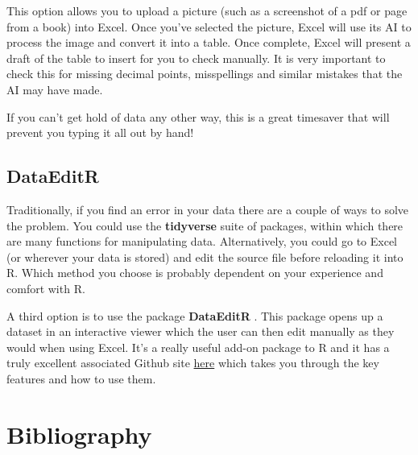 \documentclass[
]{book}
\begin{document}
This option allows you to upload a picture (such as a screenshot of a pdf or page from a book) into Excel. Once you've selected the picture, Excel will use its AI to process the image and convert it into a table. Once complete, Excel will present a draft of the table to insert for you to check manually. It is very important to check this for missing decimal points, misspellings and similar mistakes that the AI may have made.

If you can't get hold of data any other way, this is a great timesaver that will prevent you typing it all out by hand!

\hypertarget{dataeditr}{%
\section{DataEditR}\label{dataeditr}}

Traditionally, if you find an error in your data there are a couple of ways to solve the problem. You could use the \textbf{tidyverse} suite of packages, within which there are many functions for manipulating data. Alternatively, you could go to Excel (or wherever your data is stored) and edit the source file before reloading it into R. Which method you choose is probably dependent on your experience and comfort with R.

A third option is to use the package \textbf{DataEditR} \citep{dataeditr}. This package opens up a dataset in an interactive viewer which the user can then edit manually as they would when using Excel. It's a really useful add-on package to R and it has a truly excellent associated Github site \href{https://dillonhammill.github.io/DataEditR/articles/DataEditR.html}{here} which takes you through the key features and how to use them.

\hypertarget{bibliography}{%
\chapter{Bibliography}\label{bibliography}}

  
\end{document}
